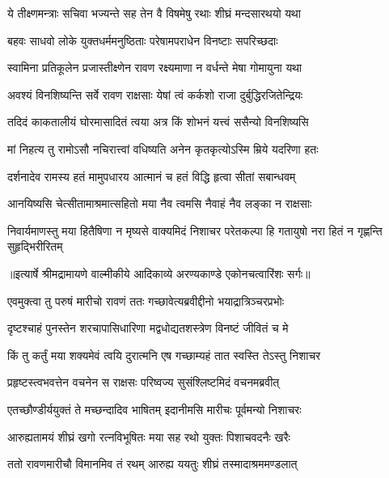 \twolineshloka
{ये तीक्ष्णमन्त्राः सचिवा भज्यन्ते सह तेन वै}
{विषमेषु रथाः शीघ्रं मन्दसारथयो यथा} %

\twolineshloka
{बहवः साधवो लोके युक्तधर्ममनुष्ठिताः}
{परेषामपराधेन विनष्टाः सपरिच्छदाः} %

\twolineshloka
{स्वामिना प्रतिकूलेन प्रजास्तीक्ष्णेन रावण}
{रक्ष्यमाणा न वर्धन्ते मेषा गोमायुना यथा} %

\twolineshloka
{अवश्यं विनशिष्यन्ति सर्वे रावण राक्षसाः}
{येषां त्वं कर्कशो राजा दुर्बुद्धिरजितेन्द्रियः} %

\twolineshloka
{तदिदं काकतालीयं घोरमासादितं त्वया}
{अत्र किं शोभनं यत्त्वं ससैन्यो विनशिष्यसि} %

\twolineshloka
{मां निहत्य तु रामोऽसौ नचिरात्त्वां वधिष्यति}
{अनेन कृतकृत्योऽस्मि म्रिये यदरिणा हतः} %

\twolineshloka
{दर्शनादेव रामस्य हतं मामुपधारय}
{आत्मानं च हतं विद्धि हृत्वा सीतां सबान्धवम्} %

\twolineshloka
{आनयिष्यसि चेत्सीतामाश्रमात्सहितो मया}
{नैव त्वमसि नैवाहं नैव लङ्का न राक्षसाः} %

\fourlineindentedshloka
{निवार्यमाणस्तु मया हितैषिणा}
{न मृष्यसे वाक्यमिदं निशाचर}
{परेतकल्पा हि गतायुषो नरा}
{हितं न गृह्णन्ति सुहृद्भिरीरितम्} %


{॥इत्यार्षे श्रीमद्रामायणे वाल्मीकीये आदिकाव्ये अरण्यकाण्डे एकोनचत्वारिंशः सर्गः॥}


\twolineshloka
{एवमुक्त्वा तु परुषं मारीचो रावणं ततः}
{गच्छावेत्यब्रवीद्दीनो भयाद्रात्रिञ्चरप्रभोः} %

\twolineshloka
{दृष्टश्चाहं पुनस्तेन शरचापासिधारिणा}
{मद्वधोद्यतशस्त्रेण विनष्टं जीवितं च मे} %

\twolineshloka
{किं तु कर्तुं मया शक्यमेवं त्वयि दुरात्मनि}
{एष गच्छाम्यहं तात स्वस्ति तेऽस्तु निशाचर} %

\twolineshloka
{प्रहृष्टस्त्वभवत्तेन वचनेन स राक्षसः}
{परिष्वज्य सुसंश्लिष्टमिदं वचनमब्रवीत्} %

\twolineshloka
{एतच्छौण्डीर्ययुक्तं ते मच्छन्दादिव भाषितम्}
{इदानीमसि मारीचः पूर्वमन्यो निशाचरः} %

\twolineshloka
{आरुह्यतामयं शीघ्रं खगो रत्नविभूषितः}
{मया सह रथो युक्तः पिशाचवदनैः खरैः} %

\twolineshloka
{ततो रावणमारीचौ विमानमिव तं रथम्}
{आरुह्य ययतुः शीघ्रं तस्मादाश्रममण्डलात्} %

